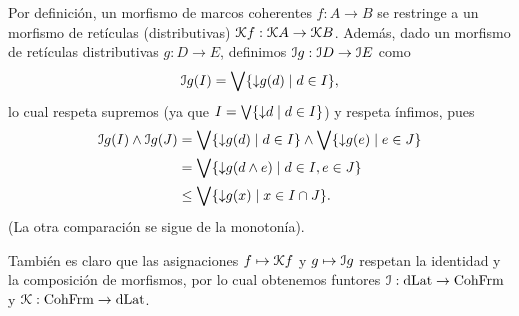 Por definición, un morfismo de marcos coherentes $f:A\to B$
se restringe a un morfismo de retículas (distributivas)
$\cal Kf:\cal KA\to\cal KB$.
Además, dado un morfismo de retículas distributivas $g:D\to E$,
definimos $\cal Ig:\cal ID\to\cal IE$ como
\[
    \cal Ig(I)
    = \Sup\{\down g(d)\mid d\in I\},
\]
lo cual respeta supremos (ya que $I=\Sup\{\down d\mid d\in I\}$)
y respeta ínfimos, pues
\begin{align*}
    \cal Ig(I)\inf\cal Ig(J)
    &= \Sup\{\down g(d)\mid d\in I\}
        \inf \Sup\{\down g(e)\mid e\in J\} \\
    &= \Sup\{\down g(d\inf e)\mid d\in I, e\in J\} \\
    &\leq \Sup\{\down g(x)\mid x\in I\cap J\}.
\end{align*}
(La otra comparación se sigue de la monotonía).

También es claro que las asignaciones $f\mapsto\cal Kf$
y $g\mapsto\cal Ig$ respetan la identidad y la composición
de morfismos, por lo cual obtenemos funtores
$\cal I:\DLat\to\CohFrm$ y $\cal K:\CohFrm\to\DLat$.

